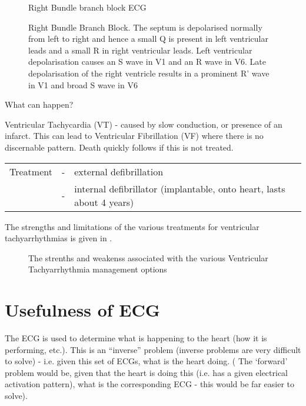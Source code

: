\begin{figure}[htbp] \centering
  \caption[Right Bundle Branch Block ECG]{Right Bundle branch block ECG}
  \label{fig:rightbbb-ecg}
\end{figure}

\begin{figure}[htbp] \centering
  \caption[Right Bundle Branch Block]{Right Bundle Branch Block.  The septum
    is depolarised normally from left to right and hence a small Q is
    present in left ventricular leads and a small R in right ventricular
    leads.  Left ventricular depolarisation causes an S wave in V1 and an R
    wave in V6.  Late depolarisation of the right ventricle results in a
    prominent R' wave in V1 and broad S wave in V6}
  \label{fig:rightbbb}
\end{figure}

What can happen?

\noindent Ventricular Tachycardia (VT) - caused by slow conduction, or
presence of an infarct. This can lead to Ventricular Fibrillation (VF) where
there is no discernable pattern.  Death quickly follows if this is not
treated. %

\begin{tabular}{lcp{13cm}}
Treatment &-&external defibrillation\\
          &-&internal defibrillator (implantable, onto heart, lasts
          about 4 years)
\end{tabular}

The strengths and limitations of the various treatments for ventricular
tachyarrhythmias is given in .

\begin{figure}[htbp] \centering
  \caption[Ventricular Tachyarrhythmia Management]{The strenths and
    weakenss associated with the various Ventricular Tachyarrhythmia
    management options}
  \label{fig:tachy-arryth}
\end{figure}

\section{Usefulness of ECG}

The ECG is used to determine what is happening to the heart (how it is
performing, etc.).  This is an ``inverse'' problem (inverse problems are very
difficult to solve) - i.e. given this set of ECGs, what is the heart doing. (
The `forward' problem would be, given that the heart is doing this (i.e. has a
given electrical activation pattern), what is the corresponding ECG - this
would be far easier to solve).

